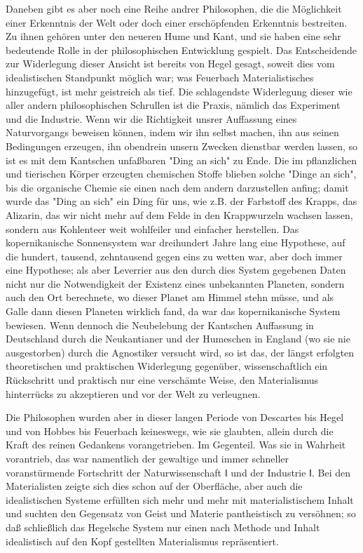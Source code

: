 Daneben gibt es aber noch eine Reihe andrer Philosophen, die die
Möglichkeit einer Erkenntnis der Welt oder doch einer erschöpfenden
Erkenntnis bestreiten. Zu ihnen gehören unter den neueren Hume und Kant,
und sie haben eine sehr bedeutende Rolle in der philosophischen
Entwicklung gespielt. Das Entscheidende zur Widerlegung dieser Ansicht
ist bereits von Hegel gesagt, soweit dies vom idealistischen Standpunkt
möglich war; was Feuerbach Materialistisches hinzugefügt, ist mehr
geistreich als tief. Die schlagendste Widerlegung dieser wie aller
andern philosophischen Schrullen ist die Praxis, nämlich das Experiment
und die Industrie. Wenn wir die Richtigkeit unsrer Auffassung eines
Naturvorgangs beweisen können, indem wir ihn selbst machen, ihn aus
seinen Bedingungen erzeugen, ihn obendrein unsern Zwecken dienstbar
werden lassen, so ist es mit dem Kantschen unfaßbaren "Ding an sich" zu
Ende. Die im pflanzlichen und tierischen Körper erzeugten chemischen
Stoffe blieben solche "Dinge an sich", bis die organische Chemie sie
einen nach dem andern darzustellen anfing; damit wurde das "Ding an
sich" ein Ding für uns, wie z.B. der Farbstoff des Krapps, das Alizarin,
das wir nicht mehr auf dem Felde in den Krappwurzeln wachsen lassen,
sondern aus Kohlenteer weit wohlfeiler und einfacher herstellen. Das
kopernikanische Sonnensystem war dreihundert Jahre lang eine Hypothese,
auf die hundert, tausend, zehntausend gegen eins zu wetten war, aber
doch immer eine Hypothese; als aber Leverrier aus den durch dies System
gegebenen Daten nicht nur die Notwendigkeit der Existenz eines
unbekannten Planeten, sondern auch den Ort berechnete, wo dieser Planet
am Himmel stehn müsse, und als Galle dann diesen Planeten wirklich fand,
da war das kopernikanische System bewiesen. Wenn dennoch die Neubelebung
der Kantschen Auffassung in Deutschland durch die Neukantianer und der
Humeschen in England (wo sie nie ausgestorben) durch die Agnostiker
versucht wird, so ist das, der längst erfolgten theoretischen und
praktischen Widerlegung gegenüber, wissenschaftlich ein Rückschritt und
praktisch nur eine verschämte Weise, den Materialismus hinterrücks zu
akzeptieren und vor der Welt zu verleugnen.

Die Philosophen wurden aber in dieser langen Periode von
Descartes bis Hegel und von Hobbes bis Feuerbach keineswegs, wie sie
glaubten, allein durch die Kraft des reinen Gedankens vorangetrieben. Im
Gegenteil. Was sie in Wahrheit vorantrieb, das war namentlich der
gewaltige und immer schneller voranstürmende Fortschritt der
Naturwissenschaft ǁ und der Industrie ǁ. Bei den Materialisten zeigte
sich dies schon auf der Oberfläche, aber auch die idealistischen Systeme
erfüllten sich mehr und mehr mit materialistischem Inhalt und suchten
den Gegensatz von Geist und Materie pantheistisch zu versöhnen; so daß
schließlich das Hegelsche System nur einen nach Methode und Inhalt
idealistisch auf den Kopf gestellten Materialismus repräsentiert.

